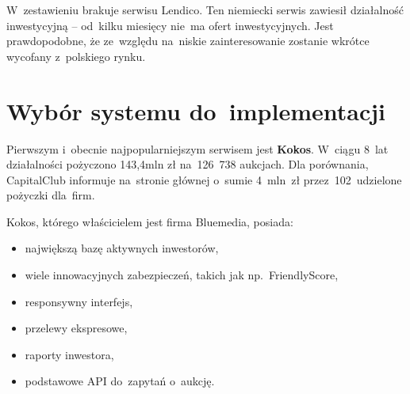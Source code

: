 \documentclass[a4paper,twoside,titlepage,openright]{book}
\begin{document}
\begin{small}
\noindent
{}
\end{small}

W~zestawieniu brakuje serwisu Lendico. Ten niemiecki serwis zawiesił działalność inwestycyjną -- od~kilku miesięcy nie~ma ofert inwestycyjnych. Jest prawdopodobne, że ze~względu na~niskie zainteresowanie zostanie wkrótce wycofany z~polskiego rynku.

\section{Wybór systemu do~implementacji}

Pierwszym i~obecnie najpopularniejszym serwisem jest \textbf{Kokos}. W~ciągu 8~lat działalności pożyczono 143,4mln zł na~126~738 aukcjach. Dla porównania, CapitalClub informuje na~stronie głównej o~sumie 4~mln~zł przez~102~udzielone pożyczki dla~firm. 

Kokos, którego właścicielem jest firma Bluemedia, posiada:
\begin{itemize}
\item największą bazę aktywnych inwestorów,
\item wiele innowacyjnych zabezpieczeń, takich jak np.~FriendlyScore,
\item responsywny interfejs,
\item przelewy ekspresowe,
\item raporty inwestora,
\item podstawowe API do~zapytań o~aukcję.
\end{itemize}
\end{document}
